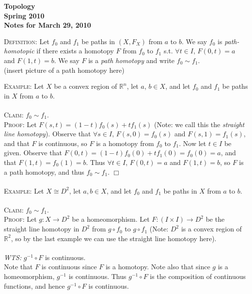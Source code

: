 \documentclass[12pt]{article}
\begin{document}
\begin{center}
	\bf
	Topology \\
	Spring 2010 \\
	\rm
	Notes for March 29, 2010 \\
\end{center}

\noindent \textsc{Definition:} Let $f_0$ and $f_1$ be paths in $(X, F_X)$ from $a$ to $b$. We say $f_0$ is \textit{path-homotopic} if there exists a homotopy $F$ from $f_0$ to $f_1$ s.t. $\forall t \in I$, $F(0,t) = a$ and $F(1, t) = b$. We say $F$ is a \textit{path homotopy} and write $f_0 \sim f_1$.
\\(insert picture of a path homotopy here)

\addvspace{1.5 in}

\noindent\textsc{Example:} Let $X$ be a convex region of $\mathbb{R}^n$, let $a$, $b \in X$, and let $f_0$ and $f_1$ be paths in $X$ from $a$ to $b$. 
\\ \\\textsc{Claim:} $f_0 \sim f_1$.
\\\textsc{Proof:} Let $F(s,t) = (1-t)f_0(s) + tf_1(s)$ (Note: we call this the \emph{straight line homotopy}). Observe that $\forall s \in I$, $F(s,0) = f_0(s)$ and $F(s,1) = f_1(s)$, and that $F$ is continuous, so $F$ is a homotopy from $f_0$ to $f_1$. Now let $t \in I$ be given. Observe that $F(0,t) = (1-t)f_0(0) + tf_1(0) = f_0(0) = a$, and that $F(1, t) = f_0(1) = b$. Thus $\forall t \in I$, $F(0,t) = a$ and $F(1,t) = b$, so $F$ is a path homotopy, and thus $f_0 \sim f_1$. $\Box$
\\ \\\textsc{Example:} Let $X \cong D^2$, let $a, b \in X$, and let $f_0$ and $f_1$ be paths in $X$ from $a$ to $b$.
\\ \\\textsc{Claim:} $f_0 \sim f_1$.
\\\textsc{Proof:} Let $g: X \rightarrow D^2$ be a homeomorphism. Let $F: (I \times I) \rightarrow D^2$ be the straight line homotopy in $D^2$ from $g \circ f_0$ to $g \circ f_1$ (Note: $D^2$ is a convex region of $\mathbb{R}^2$, so by the last example we can use the straight line homotopy here).
\\ \\\textit{WTS:} $g^{-1} \circ F$ is continuous.
\\Note that $F$ is continuous since $F$ is a homotopy. Note also that since $g$ is a homeomorphism, $g^{-1}$ is continuous. Thus $g^{-1} \circ F$ is the composition of continuous functions, and hence $g^{-1} \circ F$ is continuous.
\end{document}
